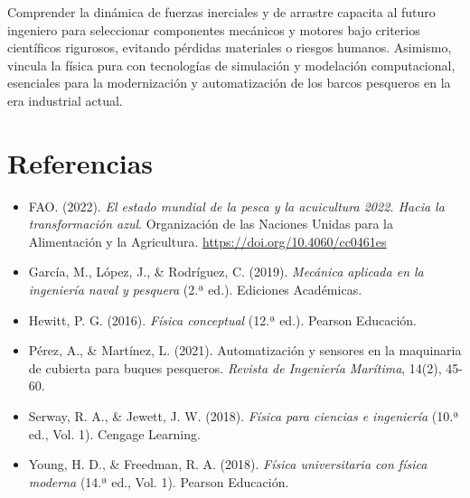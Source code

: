 \documentclass[11pt,a4paper]{article}
\begin{document}
Comprender la dinámica de fuerzas inerciales y de arrastre capacita al futuro ingeniero para seleccionar componentes mecánicos y motores bajo criterios científicos rigurosos, evitando pérdidas materiales o riesgos humanos. Asimismo, vincula la física pura con tecnologías de simulación y modelación computacional, esenciales para la modernización y automatización de los barcos pesqueros en la era industrial actual.


\section{Referencias}
\begin{itemize}
    \item FAO. (2022). \textit{El estado mundial de la pesca y la acuicultura 2022. Hacia la transformación azul}. Organización de las Naciones Unidas para la Alimentación y la Agricultura. \url{https://doi.org/10.4060/cc0461es}
    \item García, M., López, J., \& Rodríguez, C. (2019). \textit{Mecánica aplicada en la ingeniería naval y pesquera} (2.ª ed.). Ediciones Académicas.
    \item Hewitt, P. G. (2016). \textit{Física conceptual} (12.ª ed.). Pearson Educación.
    \item Pérez, A., \& Martínez, L. (2021). Automatización y sensores en la maquinaria de cubierta para buques pesqueros. \textit{Revista de Ingeniería Marítima}, 14(2), 45-60.
    \item Serway, R. A., \& Jewett, J. W. (2018). \textit{Física para ciencias e ingeniería} (10.ª ed., Vol. 1). Cengage Learning.
    \item Young, H. D., \& Freedman, R. A. (2018). \textit{Física universitaria con física moderna} (14.ª ed., Vol. 1). Pearson Educación.
\end{itemize}
\end{document}
